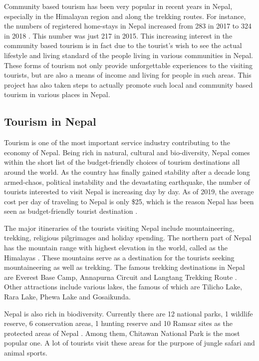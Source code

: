 \documentclass[12pt, a4paper, oneside]{article}
\begin{document}
Community based tourism has been very popular in recent years in Nepal, especially in the Himalayan region and along the trekking routes. For instance, the numbers of registered home-stays in Nepal increased from 283 in 2017 to 324 in 2018 \cite{tourismstats}. This number was just 217 in 2015. This increasing interest in the community based tourism is in fact due to the tourist's wish to see the actual lifestyle and living standard of the people living in various communities in Nepal. These forms of tourism not only provide unforgettable experiences to the visiting tourists, but are also a means of income and living for people in such areas. This project has also taken steps to actually promote such local and community based tourism in various places in Nepal.

\subsection{Tourism in Nepal}
Tourism is one of the most important service industry contributing to the economy of Nepal. Being rich in natural, cultural and bio-diversity, Nepal comes within the short list of the budget-friendly choices of tourism destinations all around the world. As the country has finally gained stability after a decade long armed-chaos, political instability and the devastating earthquake, the number of tourists interested to visit Nepal is increasing day by day. As of 2019, the average cost per day of traveling to Nepal is only \$25, which is the reason Nepal has been seen as budget-friendly tourist destination \cite{nepaltravelcost}.

The major itineraries of the tourists visiting Nepal include mountaineering, trekking, religious pilgrimages and holiday spending. The northern part of Nepal has the mountain range with highest elevation in the world, called as the Himalayas \cite{himalayas}. These mountains serve as a destination for the tourists seeking mountaineering as well as trekking. The famous trekking destinations in Nepal are Everest Base Camp, Annapurna Circuit and Langtang Trekking Route \cite{trekkingroutes}. Other attractions include various lakes, the famous of which are Tilicho Lake, Rara Lake, Phewa Lake and Gosaikunda.

Nepal is also rich in biodiversity. Currently there are 12 national parks, 1 wildlife reserve, 6 conservation areas, 1 hunting reserve and 10 Ramsar sites as the protected areas of Nepal \cite{protectedareas}. Among them, Chitawan National Park is the most popular one. A lot of tourists visit these areas for the purpose of jungle safari and animal sports.
\end{document}
